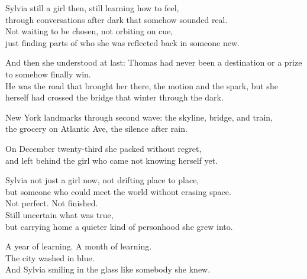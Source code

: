 \begin{lyrics}
Sylvia still a girl then, still learning how to feel,\\
through conversations after dark that somehow sounded real.\\
Not waiting to be chosen, not orbiting on cue,\\
just finding parts of who she was reflected back in someone new.

And then she understood at last: Thomas had never been a destination or a prize to somehow finally win.\\
He was the road that brought her there, the motion and the spark, but she herself had crossed the bridge that winter through the dark.

New York landmarks through second wave: the skyline, bridge, and train,\\
the grocery on Atlantic Ave, the silence after rain.

On December twenty-third she packed without regret,\\
and left behind the girl who came not knowing herself yet.

Sylvia not just a girl now, not drifting place to place,\\
but someone who could meet the world without erasing space.\\
Not perfect. %
Not finished.\\
Still uncertain what was true,\\
but carrying home a quieter kind of personhood she grew into.

A year of learning. %
A month of learning.\\
The city washed in blue.\\
And Sylvia smiling in the glass like somebody she knew.

\end{lyrics}

